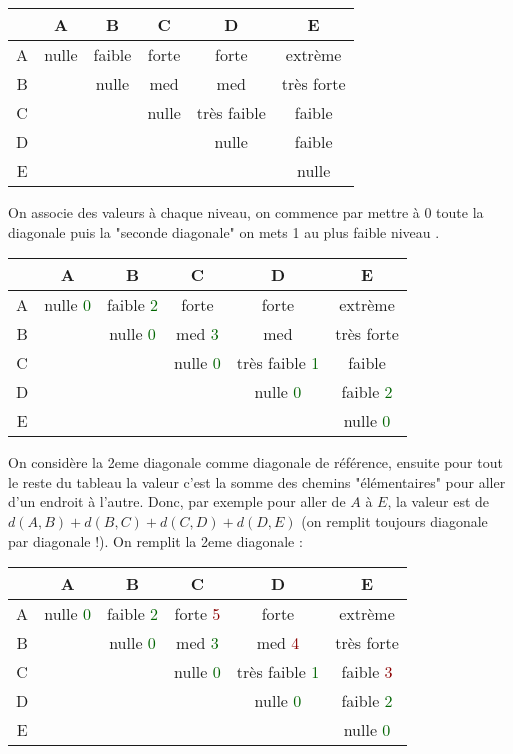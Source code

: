 \documentclass{article}
\newcommand{\gre}[1]{\textcolor{darkgreen}{#1}}
\newcommand{\red}[1]{\textcolor{darkred}{#1}}
\begin{document}
\begin{center}
	\begin{tabular}{|*{6}{c|}}
	\hline
	& A & B & C & D & E \\
	\hline
	A & nulle & faible & forte &forte & extrème \\
	\hline
	B & & nulle & med & med & très forte \\
	\hline
	C & & & nulle & très faible & faible \\
	\hline
	D & & & & nulle & faible \\
	\hline
	E & & & & & nulle \\
	\hline
	\end{tabular}
\end{center}

On associe des valeurs à chaque niveau, on commence par mettre à 0 toute la diagonale puis la "seconde diagonale" on mets 1 au plus faible niveau .

\begin{center}
	\begin{tabular}{|*{6}{c|}}
	\hline
	& A & B & C & D & E \\
	\hline
	A & nulle \gre{0} & faible \gre{2}& forte &forte & extrème \\
	\hline
	B & & nulle \gre{0}& med \gre{3}& med & très forte \\
	\hline
	C & & & nulle \gre{0} & très faible \gre{1}& faible \\
	\hline
	D & & & & nulle \gre{0}& faible \gre{2} \\
	\hline
	E & & & & & nulle \gre{0}\\
	\hline
	\end{tabular}
\end{center}

On considère la 2eme diagonale comme diagonale de référence, ensuite pour tout le reste du tableau la valeur c'est la somme des chemins "élémentaires" pour aller d'un endroit à 
l'autre. Donc, par exemple pour aller de $A$ à $E$, la valeur est de $d(A,B) + d(B,C) + d(C,D) + d(D,E)$ (on remplit toujours diagonale par diagonale !). On remplit la 2eme diagonale 
:

\begin{center}
	\begin{tabular}{|*{6}{c|}}
	\hline
	& A & B & C & D & E \\
	\hline
	A & nulle \gre{0} & faible \gre{2}& forte \red{5}&forte & extrème \\
	\hline
	B & & nulle \gre{0}& med \gre{3}& med \red{4} & très forte \\
	\hline
	C & & & nulle \gre{0} & très faible \gre{1}& faible \red{3}\\
	\hline
	D & & & & nulle \gre{0}& faible \gre{2} \\
	\hline
	E & & & & & nulle \gre{0}\\
	\hline
	\end{tabular}
\end{center}
\end{document}
